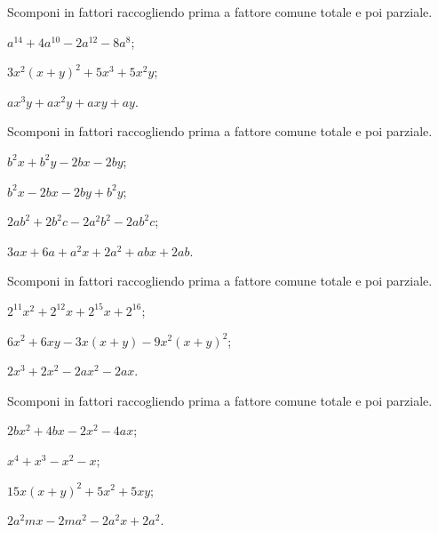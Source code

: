 \begin{esercizio}[\Ast]
\label{ese:15.30}
Scomponi in fattori raccogliendo prima a fattore comune totale e poi parziale.
\begin{multicols}{2}
 \begin{enumeratea}
 \item $a^{14}+4a^{10}-2a^{12}-8a^{8}$;
 \item $3x^{2}(x+y)^{2}+5x^{3}+5x^{2}y$;
 \item $ax^{3}y+ax^{2}y+axy+ay$.
\end{enumeratea}
\end{multicols}
\end{esercizio}

\begin{esercizio}
\label{ese:15.31}
Scomponi in fattori raccogliendo prima a fattore comune totale e poi parziale.
\begin{multicols}{2}
\begin{enumeratea}
 \item $b^{2}x+b^{2}y-2bx-2by$; %
 \item $b^{2}x-2bx-2by+b^{2}y$;%
 \item $2ab^{2}+2b^{2}c-2a^{2}b^{2}-2ab^{2}c$; %
 \item $3ax+6a+a^{2}x+2a^{2}+abx+2ab$.%
\end{enumeratea}
\end{multicols}
\end{esercizio}

\begin{esercizio}[\Ast]
\label{ese:15.32}
Scomponi in fattori raccogliendo prima a fattore comune totale e poi parziale.
\begin{enumeratea}
 \item $2^{11}x^{2}+2^{12}x+2^{15}x+2^{16}$;
 \item $6x^{2}+6xy-3x(x+y)-9x^{2}(x+y)^{2}$;
 \item $2x^{3}+2x^{2}-2ax^{2}-2ax$.

\end{enumeratea}
\end{esercizio}

\begin{esercizio}
\label{ese:15.33}
Scomponi in fattori raccogliendo prima a fattore comune totale e poi parziale.
\begin{multicols}{2}
\begin{enumeratea}
 \item $2bx^{2}+4bx-2x^{2}-4ax$;
 \item $x^{4}+x^{3}-x^{2}-x$;
 \item $15x(x+y)^{2}+5x^{2}+5xy$;
 \item $2a^{2}mx-2ma^{2}-2a^{2}x+2a^{2}$.
\end{enumeratea}
\end{multicols}
\end{esercizio}

